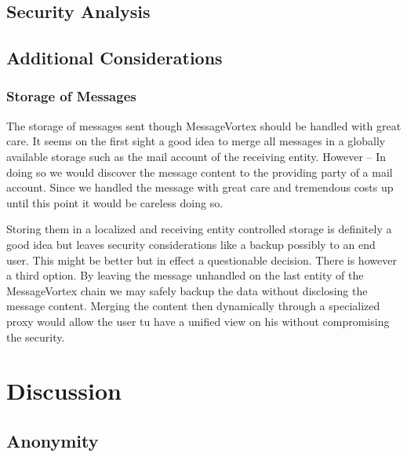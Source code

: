 \chapter{Security Analysis}
\chapter{Additional Considerations}
\section{Storage of Messages}
The storage of messages sent though MessageVortex should be handled with great care. It seems on the first sight a good idea to merge all messages in a globally available storage such as the mail account of the receiving entity. However -- In doing so we would discover the message content to the providing party of a mail account. Since we handled the message with great care and tremendous costs up until this point it would be careless doing so. 

Storing them in a localized and receiving entity controlled storage is definitely a good idea but leaves security considerations like a backup possibly to an end user. This might be better but in effect a questionable decision. There is however a third option. By leaving the message unhandled on the last entity of the MessageVortex chain we may safely backup the data without disclosing the message content. Merging the content then dynamically through a specialized proxy would allow the user tu have a unified view on his without compromising the security.


\part{Discussion}

\chapter{Anonymity}

